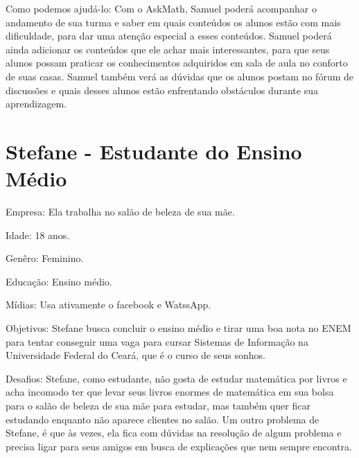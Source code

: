 Como podemos ajudá-lo: Com o AskMath, Samuel poder\'a acompanhar o andamento de sua turma e saber em quais conteúdos os alunos est\~ao com mais dificuldade, para dar uma aten\c{c}\~ao especial a 
esses conte\'udos. Samuel poderá ainda adicionar os conteúdos que ele achar mais interessantes, para que seus alunos possam praticar os conhecimentos adquiridos em sala de aula no conforto de suas 
casas. Samuel tamb\'em ver\'a as dúvidas que os alunos postam no fórum de discuss\~oes e quais desses alunos est\~ao enfrentando obstáculos durante sua aprendizagem.

\section{Stefane - Estudante do Ensino Médio}

\begin{figure}[h!]
  \centering
\end{figure}



Empresa: Ela trabalha no salão de beleza de sua mãe.

Idade: 18 anos.

Genêro: Feminino.

Educação: Ensino médio.

Mídias: Usa ativamente o facebook e WatssApp.

Objetivos: Stefane busca concluir o ensino médio e tirar uma boa nota no ENEM 
para tentar conseguir uma vaga para cursar Sistemas de Informação na Universidade Federal do Cear\'a, que é 
o curso de seus sonhos.

Desafios: Stefane, como estudante, não gosta de estudar matemática por livros e acha incomodo ter que levar seus livros enormes de matemática em sua bolsa para o salão de beleza de sua mãe para 
estudar, mas tamb\'em quer ficar estudando enquanto não aparece clientes no salão. Um outro problema de Stefane, é que às vezes, ela fica com dúvidas na resolução de algum problema e precisa ligar 
para seus amigos em busca de explicações que nem sempre encontra.

